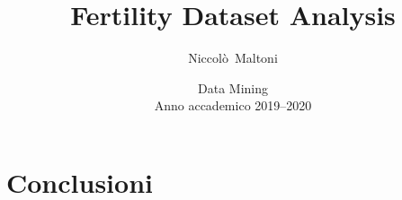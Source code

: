 \documentclass[a4paper,11pt,notitlepage,final]{scrartcl}
\title{\LARGE{\textbf{Fertility Dataset Analysis}}}
\author{Niccolò~Maltoni}
\date{%
  \small{Data Mining}\\%
  \small{Anno accademico 2019--2020}
}
\begin{document}
\maketitle







\section{Conclusioni}
\end{document}
